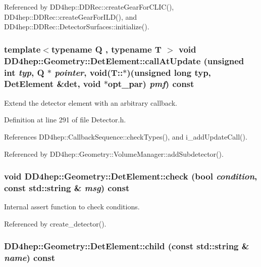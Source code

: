 Referenced by DD4hep::DDRec::createGearForCLIC(), DD4hep::DDRec::createGearForILD(), and DD4hep::DDRec::DetectorSurfaces::initialize().\hypertarget{class_d_d4hep_1_1_geometry_1_1_det_element_a0b5ccd59de30369496419134f803855c}{
\subsubsection[{callAtUpdate}]{\setlength{\rightskip}{0pt plus 5cm}template$<$typename Q , typename T $>$ void DD4hep::Geometry::DetElement::callAtUpdate (unsigned int {\em typ}, \/  Q $\ast$ {\em pointer}, \/  void(T::$\ast$)(unsigned long typ, {\bf DetElement} \&det, void $\ast$opt\_\-par) {\em pmf}) const}}
\label{class_d_d4hep_1_1_geometry_1_1_det_element_a0b5ccd59de30369496419134f803855c}


Extend the detector element with an arbitrary callback. 

Definition at line 291 of file Detector.h.

References DD4hep::CallbackSequence::checkTypes(), and i\_\-addUpdateCall().

Referenced by DD4hep::Geometry::VolumeManager::addSubdetector().\hypertarget{class_d_d4hep_1_1_geometry_1_1_det_element_a918c9ab5a3c4ba94c2b7ad97de67e5de}{
\subsubsection[{check}]{\setlength{\rightskip}{0pt plus 5cm}void DD4hep::Geometry::DetElement::check (bool {\em condition}, \/  const std::string \& {\em msg}) const}}
\label{class_d_d4hep_1_1_geometry_1_1_det_element_a918c9ab5a3c4ba94c2b7ad97de67e5de}


Internal assert function to check conditions. 

Referenced by create\_\-detector().\hypertarget{class_d_d4hep_1_1_geometry_1_1_det_element_ab00408422c16bff12f36bbaff9b404a1}{
\subsubsection[{child}]{ DD4hep::Geometry::DetElement::child (const std::string \& {\em name}) const}}
\label{class_d_d4hep_1_1_geometry_1_1_det_element_ab00408422c16bff12f36bbaff9b404a1}


